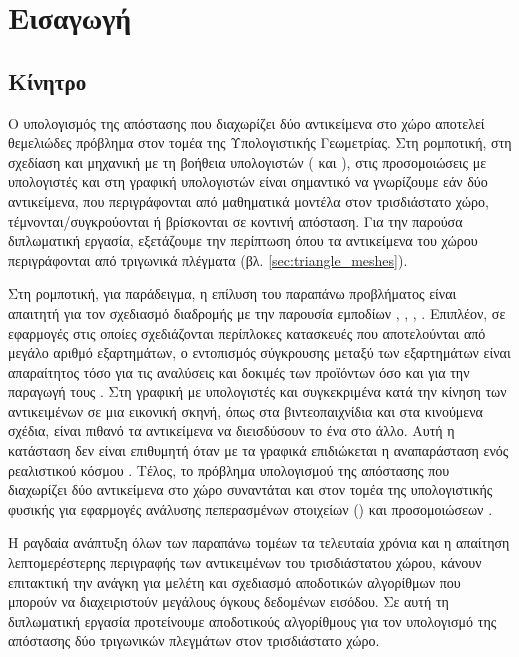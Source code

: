 \chapter{Εισαγωγή}
\label{ch:introduction}
\section{Κίνητρο}
Ο υπολογισμός της απόστασης που διαχωρίζει δύο αντικείμενα στο 
χώρο αποτελεί θεμελιώδες πρόβλημα στον τομέα της Υπολογιστικής
Γεωμετρίας.
Στη ρομποτική, στη σχεδίαση και μηχανική με τη βοήθεια υπολογιστών 
( και ), στις προσομοιώσεις με υπολογιστές και στη γραφική 
υπολογιστών είναι σημαντικό να γνωρίζουμε εάν δύο αντικείμενα, που περιγράφονται 
από μαθηματικά μοντέλα στον τρισδιάστατο χώρο, τέμνονται/συγκρούονται ή βρίσκονται 
σε κοντινή απόσταση.
Για την παρούσα διπλωματική εργασία, εξετάζουμε την περίπτωση όπου τα αντικείμενα
του χώρου περιγράφονται από τριγωνικά πλέγματα (βλ. \ref{sec:triangle_meshes}). 

Στη ρομποτική, για παράδειγμα, η επίλυση του παραπάνω προβλήματος 
είναι απαιτητή για τον σχεδιασμό διαδρομής με την παρουσία εμποδίων
\cite{brooks1985subdivision},
\cite{cameron1985study}, 
\cite{canny1986collision}, 
\cite{culley1986collision}.
Επιπλέον, σε εφαρμογές  στις οποίες σχεδιάζονται περίπλοκες 
κατασκευές που αποτελούνται από μεγάλο αριθμό εξαρτημάτων, ο εντοπισμός 
σύγκρουσης μεταξύ των εξαρτημάτων είναι απαραίτητος τόσο για τις αναλύσεις 
και δοκιμές των προϊόντων όσο και για την παραγωγή τους 
\cite{boyse1979interference}. 
Στη γραφική με υπολογιστές και συγκεκριμένα κατά την κίνηση των 
αντικειμένων σε μια εικονική σκηνή, όπως στα βιντεοπαιχνίδια και 
στα κινούμενα σχέδια, είναι πιθανό τα αντικείμενα να διεισδύσουν το 
ένα στο άλλο. Αυτή η κατάσταση δεν είναι επιθυμητή όταν με τα 
γραφικά επιδιώκεται η αναπαράσταση ενός ρεαλιστικού κόσμου
\cite{moore1988collision}.
Τέλος, το πρόβλημα υπολογισμού της απόστασης που διαχωρίζει δύο αντικείμενα 
στο χώρο συναντάται και στον τομέα της υπολογιστικής φυσικής για εφαρμογές 
ανάλυσης πεπερασμένων στοιχείων () και προσομοιώσεων 
\cite{khamayseh2007use}.

Η ραγδαία ανάπτυξη όλων των παραπάνω τομέων τα τελευταία χρόνια
και η απαίτηση λεπτομερέστερης περιγραφής των αντικειμένων του
τρισδιάστατου χώρου, κάνουν επιτακτική την ανάγκη για μελέτη
και σχεδιασμό αποδοτικών αλγορίθμων που μπορούν να διαχειριστούν
μεγάλους όγκους δεδομένων εισόδου. Σε αυτή τη διπλωματική εργασία
προτείνουμε αποδοτικούς αλγορίθμους για τον υπολογισμό της απόστασης 
δύο τριγωνικών πλεγμάτων στον τρισδιάστατο χώρο.


